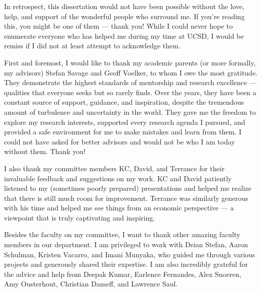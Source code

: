 \begin{acknowledgements}
In retrospect, this dissertation would not have been possible without the love, help,  and support of the wonderful people who surround me. If you're reading this, you might be one of them --- thank you!
While I could never hope to enumerate everyone who has helped me during my time at UCSD, I would be remiss if I did not at least attempt to acknowledge them. 


First and foremost, I would like to thank my academic parents (or more formally, my advisors) Stefan Savage and Geoff Voelker,
to whom I owe the most gratitude. They demonstrate the highest standards of mentorship and research excellence --- qualities that everyone seeks but so rarely finds.
Over the years, they have been a constant source of support, guidance, and inspiration, despite the tremendous amount of turbulence and uncertainty in the world. They gave me the freedom to explore my research interests, supported every research agenda I pursued, and provided a safe environment for me to make mistakes and learn from them. I could not have asked for better advisors and would not be who I am today without them. Thank you!


I also thank my committee members KC, David, and Terrance
for their invaluable feedback and suggestions on my work. KC and David patiently listened to my (sometimes poorly prepared) presentations and helped me realize that there is still much room for improvement. Terrance was similarly generous with his time and helped me see things from an economic perspective --- a viewpoint that is truly captivating and inspiring.

Besides the faculty on my committee, I want to thank other amazing faculty members in our department. I am privileged to work with Deian Stefan, Aaron Schulman, Kristen Vacarro, and Imani Munyaka, who guided me through various projects and generously shared their expertise. I am also incredibly grateful for the advice and help from Deepak Kumar, Earlence Fernandes, Alex Snoeren, Amy Ousterhout, Christian Dameff, and Lawrence Saul.


\end{acknowledgements}
